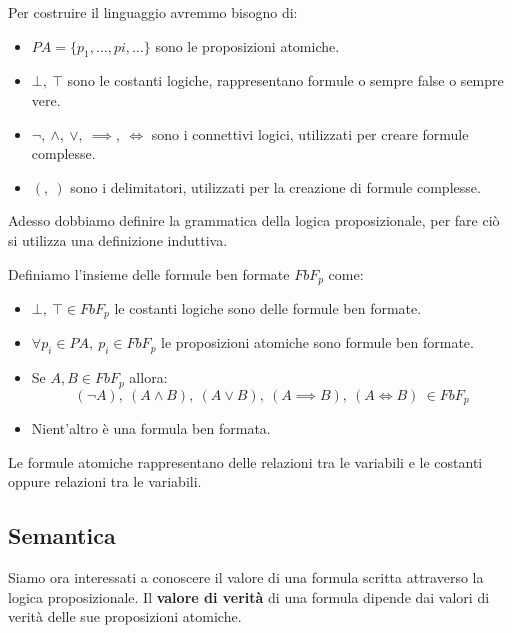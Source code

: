 Per costruire il linguaggio avremmo bisogno di:
\begin{itemize}
    \item $PA = \{p_1, \dots, pi, \dots\}$ sono le proposizioni atomiche.
    \item $\bot, \ \top$ sono le costanti logiche, rappresentano formule o sempre
          false o sempre vere.
    \item $\lnot, \ \land, \ \lor, \ \implies, \ \iff$ sono i connettivi logici,
          utilizzati per creare formule complesse.
    \item $(, \ )$ sono i delimitatori, utilizzati per la creazione di formule
          complesse.
\end{itemize}
Adesso dobbiamo definire la grammatica della logica proposizionale, per fare ciò
si utilizza una definizione induttiva.
\begin{definizione}
    Definiamo l'insieme delle formule ben formate $FbF_p$ come:
    \begin{itemize}
        \item $\bot, \ \top \in FbF_p$ le costanti logiche sono delle formule ben
              formate.
        \item $\forall p_i \in PA, \ p_i \in FbF_p$ le proposizioni atomiche sono
              formule ben formate.
        \item Se $A, B \in FbF_p$ allora:
              \begin{equation}
                  (\lnot A), \ (A \land B), \ (A \lor B), \ (A \implies B), \
                  (A \iff B) \ \in FbF_p
              \end{equation}
        \item Nient'altro è una formula ben formata.
    \end{itemize}
\end{definizione}
Le formule atomiche rappresentano delle relazioni tra le variabili e le costanti
oppure relazioni tra le variabili.
\subsection{Semantica}
Siamo ora interessati a conoscere il valore di una formula scritta attraverso la
logica proposizionale. Il \textbf{valore di verità} di una formula dipende dai
valori di verità delle sue proposizioni atomiche.

